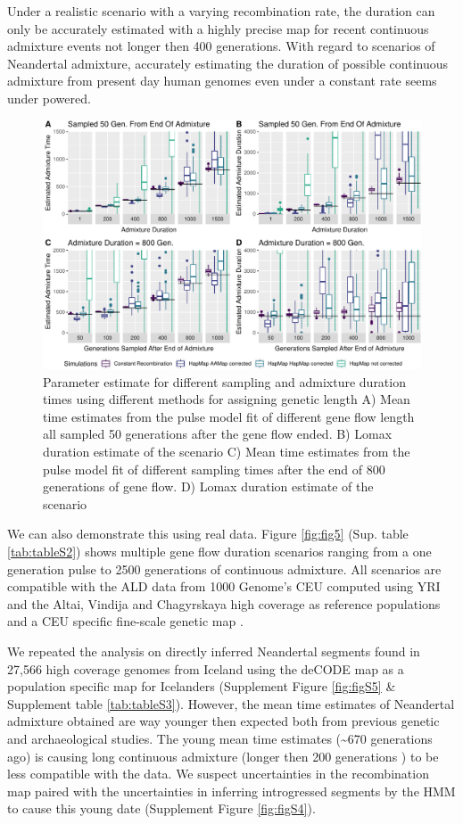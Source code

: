 \documentclass[]{article}
\begin{document}
Under a realistic scenario with a varying recombination
rate, the duration can only be accurately estimated with a highly
precise map for recent continuous admixture events not longer then 400
generations. With regard to scenarios of Neandertal admixture,
accurately estimating the duration of possible continuous admixture from
present day human genomes even under a constant rate seems
under powered. 


\begin{figure}
\centering
\includegraphics{Admixture_Time_Inference_Paper_Draft_files/figure-latex/fig4-1.pdf}
\caption{\label{fig:fig4} Parameter estimate for different sampling and
admixture duration times using different methods for assigning genetic
length A) Mean time estimates from the pulse model fit of different gene
flow length all sampled 50 generations after the gene flow ended. B)
Lomax duration estimate of the scenario C) Mean time estimates from the
pulse model fit of different sampling times after the end of 800
generations of gene flow. D) Lomax duration estimate of the scenario}
\end{figure}


We can also demonstrate this using real data.
Figure \ref{fig:fig5} (Sup. table \ref{tab:tableS2}) shows multiple gene flow duration scenarios ranging from a one generation pulse to 2500 generations of continuous admixture. All scenarios are compatible with the ALD data from 1000 Genome's CEU computed using YRI and the Altai, Vindija and Chagyrskaya high coverage as reference populations and a CEU specific fine-scale genetic map \citep{spence_inference_2019}.

We repeated the analysis on directly inferred Neandertal segments found in 27,566 high coverage genomes from Iceland \citep{skov_nature_2020} using the deCODE map \citep{kong_fine-scale_2010} as a population specific map for Icelanders (Supplement Figure \ref{fig:figS5} \& Supplement table \ref{tab:tableS3}). However, the mean time estimates of Neandertal admixture obtained are way younger then expected both from previous genetic and archaeological studies. The young mean time estimates (\textasciitilde{}670 generations ago) is causing long continuous admixture (longer then 200 generations ) to be less compatible with the data. We suspect uncertainties in the recombination map paired with the uncertainties in inferring introgressed segments by the HMM to cause this young date (Supplement Figure \ref{fig:figS4}).
\end{document}
